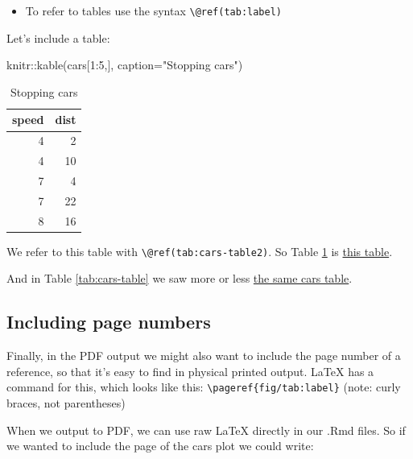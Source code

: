 \documentclass[a4paper, twoside]{templates/ociamthesis}
\providecommand{\tightlist}{%
  \setlength{\itemsep}{0pt}\setlength{\parskip}{0pt}}
\newenvironment{Shaded}{\begin{snugshade}}{\end{snugshade}}
\newcommand{\AttributeTok}[1]{\textcolor[rgb]{0.77,0.63,0.00}{#1}}
\newcommand{\DecValTok}[1]{\textcolor[rgb]{0.00,0.00,0.81}{#1}}
\newcommand{\FunctionTok}[1]{\textcolor[rgb]{0.00,0.00,0.00}{#1}}
\newcommand{\NormalTok}[1]{#1}
\newcommand{\SpecialCharTok}[1]{\textcolor[rgb]{0.00,0.00,0.00}{#1}}
\newcommand{\StringTok}[1]{\textcolor[rgb]{0.31,0.60,0.02}{#1}}
\renewenvironment{Shaded}
{
  \vspace{10pt}%
  \begin{snugshade}%
}{%
  \end{snugshade}%
  \vspace{8pt}%
}
\begin{document}
\begin{itemize}
\tightlist
\item
  To refer to tables use the syntax \texttt{\textbackslash{}@ref(tab:label)}
\end{itemize}

Let's include a table:

\begin{Shaded}
\begin{Highlighting}[]
\NormalTok{knitr}\SpecialCharTok{::}\FunctionTok{kable}\NormalTok{(cars[}\DecValTok{1}\SpecialCharTok{:}\DecValTok{5}\NormalTok{,],}
            \AttributeTok{caption=}\StringTok{"Stopping cars"}\NormalTok{)}
\end{Highlighting}
\end{Shaded}

\begin{table}

\caption{\label{tab:cars-table2}Stopping cars}
\centering
\begin{tabular}[t]{r|r}
\hline
speed & dist\\
\hline
4 & 2\\
\hline
4 & 10\\
\hline
7 & 4\\
\hline
7 & 22\\
\hline
8 & 16\\
\hline
\end{tabular}
\end{table}

We refer to this table with \texttt{\textbackslash{}@ref(tab:cars-table2)}.
So Table \ref{tab:cars-table2} is \protect\hyperlink{tab:cars-table2}{this table}.

And in Table \ref{tab:cars-table} we saw more or less \protect\hyperlink{tab:cars-table}{the same cars table}.

\hypertarget{including-page-numbers}{%
\subsection{Including page numbers}\label{including-page-numbers}}

Finally, in the PDF output we might also want to include the page number of a reference, so that it's easy to find in physical printed output.
LaTeX has a command for this, which looks like this: \texttt{\textbackslash{}pageref\{fig/tab:label\}} (note: curly braces, not parentheses)

When we output to PDF, we can use raw LaTeX directly in our .Rmd files. So if we wanted to include the page of the cars plot we could write:
\end{document}
